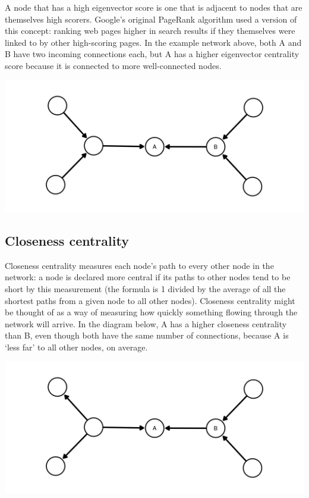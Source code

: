 \documentclass[
]{book}
\begin{document}
A node that has a high eigenvector score is one that is adjacent to nodes that are themselves high scorers. Google's original PageRank algorithm used a version of this concept: ranking web pages higher in search results if they themselves were linked to by other high-scoring pages. In the example network above, both A and B have two incoming connections each, but A has a higher eigenvector centrality score because it is connected to more well-connected nodes.

\includegraphics{images/eigenvector.png}

\hypertarget{closeness-centrality}{%
\subsection{Closeness centrality}\label{closeness-centrality}}

Closeness centrality measures each node's path to every other node in the network: a node is declared more central if its paths to other nodes tend to be short by this measurement (the formula is 1 divided by the average of all the shortest paths from a given node to all other nodes). Closeness centrality might be thought of as a way of measuring how quickly something flowing through the network will arrive. In the diagram below, A has a higher closeness centrality than B, even though both have the same number of connections, because A is `less far' to all other nodes, on average.

\includegraphics{images/closeness.png}
\end{document}
